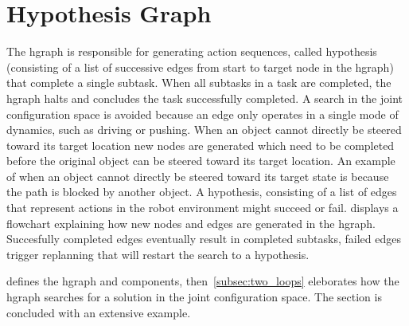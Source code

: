\section{Hypothesis Graph}%
\label{sec:hgraph}
The \ac{hgraph} is responsible for generating action sequences, called hypothesis (consisting of a list of successive edges from start to target node in the \ac{hgraph}) that complete a single subtask. When all subtasks in a task are completed, the \ac{hgraph} halts and concludes the task successfully completed. A search in the joint configuration space is avoided because an edge only operates in a single mode of dynamics, such as driving or pushing. When an object cannot directly be steered toward its target location new nodes are generated which need to be completed before the original object can be steered toward its target location. An example of when an object cannot directly be steered toward its target state is because the path is blocked by another object. A hypothesis, consisting of a list of edges that represent actions in the robot environment might succeed or fail.  displays a flowchart explaining how new nodes and edges are generated in the \ac{hgraph}. Succesfully completed edges eventually result in completed subtasks, failed edges trigger replanning that will restart the search to a hypothesis.\bs

 defines the \ac{hgraph} and components, then~\cref{subsec:two_loops} eleborates how the \ac{hgraph} searches for a solution in the joint configuration space. The section is concluded with an extensive example.\bs





